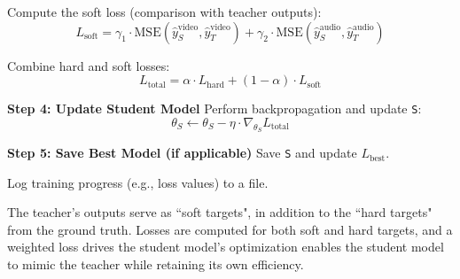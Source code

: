 \begin{algorithm}[ht!]
\begin{algorithmic}[1]
            \STATE Compute the soft loss (comparison with teacher outputs):
            \[
            L_\text{soft} = \gamma_1 \cdot \text{MSE}(\hat{y}_S^\text{video}, \hat{y}_T^\text{video}) +
                            \gamma_2 \cdot \text{MSE}(\hat{y}_S^\text{audio}, \hat{y}_T^\text{audio})
            \]

            \STATE Combine hard and soft losses:
            \[
            L_\text{total} = \alpha \cdot L_\text{hard} + (1 - \alpha) \cdot L_\text{soft}
            \]
    
            \STATE \textbf{Step 4: Update Student Model}
            \STATE Perform backpropagation and update \texttt{S}:
            \[
            \theta_S \gets \theta_S - \eta \cdot \nabla_{\theta_S} L_\text{total}
            \]
    
            \STATE \textbf{Step 5: Save Best Model (if applicable)}
                \STATE Save \texttt{S} and update \texttt{$L_\text{best}$}.
            \ENDIF
    
            \STATE Log training progress (e.g., loss values) to a file.
        \ENDFOR
    \end{algorithmic}
\end{algorithm}
The teacher's outputs serve as ``soft targets", in addition to the ``hard targets" from the ground truth. Losses are computed for both soft and hard targets, and a weighted loss drives the student model's optimization enables the student model to mimic the teacher while retaining its own efficiency.

